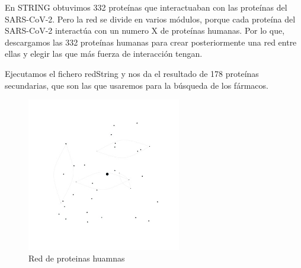 En STRING obtuvimos 332 proteínas que interactuaban con las proteínas del SARS-CoV-2. Pero la red se divide en varios módulos, porque cada proteína del SARS-CoV-2 interactúa con un numero X de proteínas humanas. Por lo que, descargamos las 332 proteínas humanas para crear posteriormente una red entre ellas y elegir las que más fuerza de interacción tengan. 

Ejecutamos el fichero redString y nos da el resultado de 178 proteínas secundarias, que son las que usaremos para la búsqueda de los fármacos. 

		\begin{figure}[h!]
			\includegraphics[width=0.6\textwidth]{figures/redsecundaria.jpeg}
			\caption{Red de proteinas huamnas}
			\label{fig:cost_megabase}
		\end{figure}
		
	\newpage

